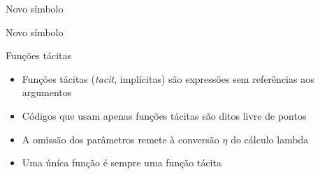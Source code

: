 \begin{frame}[fragile]{Novo símbolo}


\end{frame}

\begin{frame}[fragile]{Novo símbolo}


\end{frame}

\begin{frame}[fragile]{Funções tácitas}

    \begin{itemize}
        \item Funções tácitas (\textit{tacit}, implícitas) são expressões sem referências aos argumentos
        \pause

        \item Códigos que usam apenas funções tácitas são ditos livre de pontos
        \pause

        \item A omissão dos parâmetros remete à conversão $\eta$ do cálculo lambda
        \pause

        \item Uma úníca função é sempre uma função tácita

    \end{itemize}

\end{frame}

